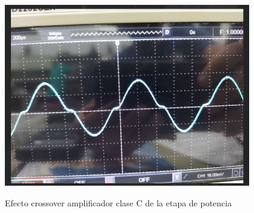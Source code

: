 \begin{ilustracion}
    \centering
    \includegraphics[width=0.8\textwidth]{src/images/p1/p1-efecto-crossover.png}
    \caption{Efecto crossover amplificador clase C de la etapa de potencia}
    \label{ilus:efecto-crossover-amplificador-clase-c}
\end{ilustracion}
